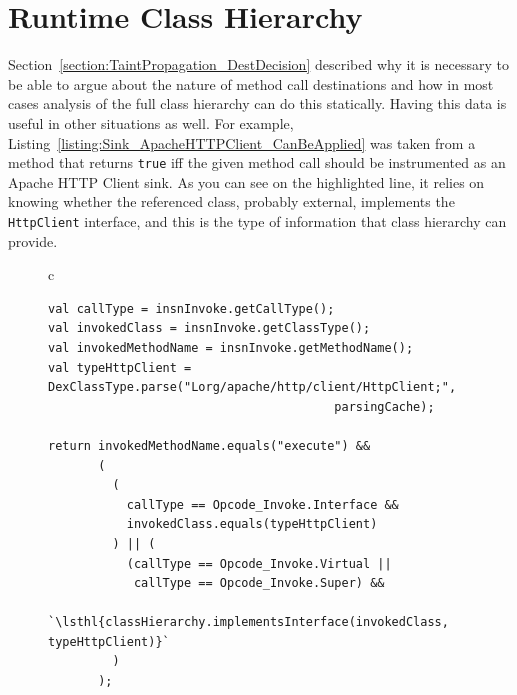 \documentclass[12pt,twoside,notitlepage]{report}
\newcommand{\highlight}[1]{\colorbox{lightOrange}{\strut #1}}
\newcommand{\lsthl}[1] {\ttfamily\scriptsize\highlight{#1}}
\begin{document}

\section{Runtime Class Hierarchy}

Section~\ref{section:TaintPropagation_DestDecision} described why it is necessary to be able to argue about the nature of method call destinations and how in most cases analysis of the full class hierarchy can do this statically. Having this data is useful in other situations as well. For example, Listing~\ref{listing:Sink_ApacheHTTPClient_CanBeApplied} was taken from a method that returns \verb$true$ iff the given method call should be instrumented as an Apache HTTP Client sink. As you can see on the highlighted line, it relies on knowing whether the referenced class, probably external, implements the \verb$HttpClient$ interface, and this is the type of information that class hierarchy can provide.

\begin{figure}[h]
	\centering
	\begin{tabular}{c}
	\begin{lstlisting}
val callType = insnInvoke.getCallType();
val invokedClass = insnInvoke.getClassType();
val invokedMethodName = insnInvoke.getMethodName();
val typeHttpClient = DexClassType.parse("Lorg/apache/http/client/HttpClient;", 
                                        parsingCache);

return invokedMethodName.equals("execute") &&
       (
         (
           callType == Opcode_Invoke.Interface && 
           invokedClass.equals(typeHttpClient)
         ) || (
           (callType == Opcode_Invoke.Virtual || 
           	callType == Opcode_Invoke.Super) && 
           `\lsthl{classHierarchy.implementsInterface(invokedClass, typeHttpClient)}`
         )
       );
	\end{lstlisting}
	\end{tabular}
	\begin{lstlisting}[caption={Code that decides whether a method call given by instruction in \texttt{insnInvoke} should be instrumented as an Apache HTTP Client sink.},
	                   label={listing:Sink_ApacheHTTPClient_CanBeApplied}]
	\end{lstlisting}
\end{figure}
\end{document}
